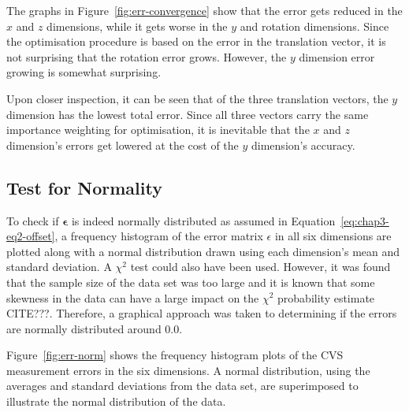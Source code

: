 The graphs in Figure~\ref{fig:err-convergence} show that the error gets reduced in the $x$ and $z$ dimensions, while it gets worse in the $y$ and rotation dimensions. Since the optimisation procedure is based on the error in the translation vector, it is not surprising that the rotation error grows. However, the $y$ dimension error growing is somewhat surprising.  %

Upon closer inspection, it can be seen that of the three translation vectors, the $y$ dimension has the lowest total error. Since all three vectors carry the same importance weighting for optimisation, it is inevitable that the $x$ and $z$ dimension's errors get lowered at the cost of the $y$ dimension's accuracy. 

\subsection{Test for Normality}
\label{sec:err-norm-test}

To check if $\bm{\epsilon}$ is indeed normally distributed as assumed in Equation~\ref{eq:chap3-eq2-offset}, a frequency histogram of the error matrix $\epsilon$ in all six dimensions are plotted along with a normal distribution drawn using each dimension's mean and standard deviation. A $\chi^2$ test could also have been used. However, it was found that the sample size of the data set was too large and it is known that some skewness in the data can have a large impact on the $\chi^2$ probability estimate CITE???. Therefore, a graphical approach was taken to determining if the errors are normally distributed around 0.0. 

Figure~\ref{fig:err-norm} shows the frequency histogram plots of the CVS measurement errors in the six dimensions. A normal distribution, using the averages and standard deviations from the data set, are superimposed to illustrate the normal distribution of the data.

